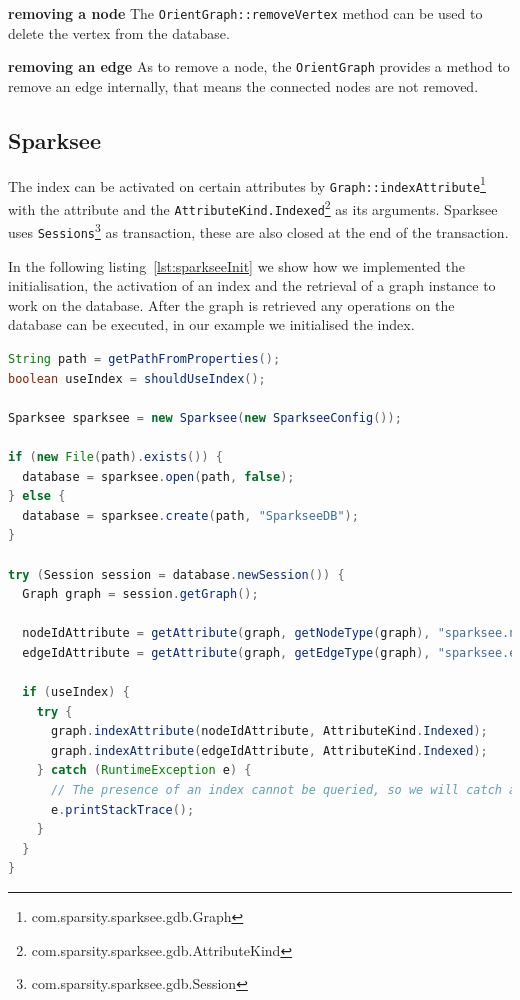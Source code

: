 \textbf{removing a node} \newline
The \texttt{OrientGraph::removeVertex} method can be used to delete the vertex from the database.

\textbf{removing an edge} \newline
As to remove a node,
the \texttt{OrientGraph} provides a method to remove an edge internally,
that means the connected nodes are not removed.

\subsection{Sparksee}
The index can be activated on certain attributes by \texttt{Graph::indexAttribute}\footnote{com.sparsity.sparksee.gdb.Graph} with the attribute and the \texttt{AttributeKind.Indexed}\footnote{com.sparsity.sparksee.gdb.AttributeKind} as its arguments.
Sparksee uses \texttt{Sessions}\footnote{com.sparsity.sparksee.gdb.Session} as transaction,
these are also closed at the end of the transaction.

In the following listing~\ref{lst:sparkseeInit} we show how we implemented the initialisation, the activation of an index and the retrieval of a graph instance to work on the database.
After the graph is retrieved any operations on the database can be executed,
in our example we initialised the index.

\begin{lstlisting}[language=Java,label={lst:sparkseeInit},caption={Implementation of the initialisation and starting of a session.}]
String path = getPathFromProperties();
boolean useIndex = shouldUseIndex();

Sparksee sparksee = new Sparksee(new SparkseeConfig());

if (new File(path).exists()) {
  database = sparksee.open(path, false);
} else {
  database = sparksee.create(path, "SparkseeDB");
}

try (Session session = database.newSession()) {
  Graph graph = session.getGraph();

  nodeIdAttribute = getAttribute(graph, getNodeType(graph), "sparksee.nodeId");
  edgeIdAttribute = getAttribute(graph, getEdgeType(graph), "sparksee.edgeId");

  if (useIndex) {
    try {
      graph.indexAttribute(nodeIdAttribute, AttributeKind.Indexed);
      graph.indexAttribute(edgeIdAttribute, AttributeKind.Indexed);
    } catch (RuntimeException e) {
      // The presence of an index cannot be queried, so we will catch and ignore the exception thrown when an index already exists.
      e.printStackTrace();
    }
  }
}
\end{lstlisting}

